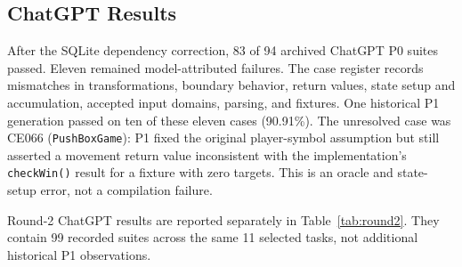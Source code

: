 \subsection{ChatGPT Results}
\label{subsec:chatgpt_results}
After the SQLite dependency correction, 83 of 94 archived ChatGPT P0 suites passed. Eleven remained model-attributed failures. The case register records mismatches in transformations, boundary behavior, return values, state setup and accumulation, accepted input domains, parsing, and fixtures. One historical P1 generation passed on ten of these eleven cases (90.91\%). The unresolved case was CE066 (\texttt{PushBoxGame}): P1 fixed the original player-symbol assumption but still asserted a movement return value inconsistent with the implementation's \texttt{checkWin()} result for a fixture with zero targets. This is an oracle and state-setup error, not a compilation failure.

Round-2 ChatGPT results are reported separately in Table~\ref{tab:round2}. They contain 99 recorded suites across the same 11 selected tasks, not additional historical P1 observations.
